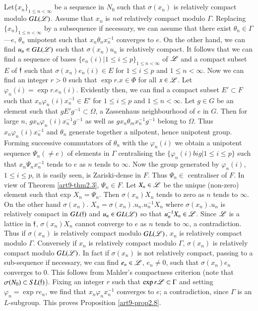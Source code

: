 \subsection{}\label{art9-subsec2.9}
Let\pageoriginale $\{x_n\}_{1 \leqslant n < \infty}$ be a sequence in $N_0$ such that $\sigma (x_n)$ is relatively compact modulo $GL(\mathscr{L})$. Assume that $x_n$ is \textit{not} relatively compact modulo $\Gamma$. Replacing  $\{x_n\}_{1\leq n < \infty}$ by a subsequence if necessary, we can assume that there exist $\theta_n \in \Gamma$---$e$, $\theta_n$  unipotent such that $x_n \theta_n x^{-1}_n$ converges to $e$. On the other hand, we can find $u_n \in GL(\mathscr{L})$ such that $\sigma (x_n) u_n$ is relatively compact. It follows that we can find a sequence of bases $\{e_n (i) \big| 1 \leqslant i \leqslant p\}_{1 \leqslant n < \infty}$ of $\mathscr{L}$ and a compact subset $E$ of $\mathfrak{f}$ such that $\sigma (x_n) e_n (i) \in E$ for $1 \leqslant i \leqslant p$ and $1 \leqslant n < \infty$. Now we can find an integer $r >0$ such that $\exp r. x \in \Phi$ for all $x \in \mathscr{L}$. Let $\varphi_n (i) = \exp r. e_n (i)$. Evidently then, we can find a compact subset $E'\subset F$ such that $x_n \varphi_n (i) x^{-1}_n \in E'$ for $1 \leqslant i \leqslant p$ and $1 \leqslant n < \infty$. Let $g \in G$ be an element such that $g E' g^{-1} \subset \Omega$, a Zassenhaus neighbourhood of $e$ in $G$. Then for large $n$, $gx_n \varphi_n (i) x^{-1}_n g^{-1}$  as well as $gx_n \theta_m x^{-1}_n g^{-1}$ belong to $\Omega$. Thus $x_n \varphi_n (i)x^{-1}_n$ and $\theta_n$ generate together a nilpotent, hence unipotent group. Forming successive commutators of $\theta_n$ with the $\varphi_n (i)$ we obtain a unipotent sequence $\Psi_n (\neq e)$ of elements in $\Gamma$ centralising the $\{\varphi_n (i) big| 1 \leqslant i \leqslant p\}$ such that $x_n \Psi_n x^{-1}_n$ tends to $e$ as $n$ tends to $\infty$. Now the group generated by $\varphi_n (i)$, $1 \leqslant i \leqslant p$, it is easily seen, is Zariski-dense in $F$. Thus $\Psi_n \in $ centraliser of $F$. In view of Theorem \ref{art9-thm2.3}, $\Psi_n \in F$. Let $X_n \in \mathscr{L}$ be the unique (non-zero) element such that exp $X_n = \Psi_n$. Then $\sigma (x_n) X_n$ tends to zero as $n$ tends to $\infty$. On the other hand $\sigma(x_n)$. $X_n = \sigma (x_n). u_n. u^{-1}_n X_n$ where $\sigma (x_n). u_n$ is relatively compact in $GL(\mathfrak{f})$ and $u_n \in G L (\mathscr{L})$ so that $u^{-1}_n X_n \in \mathscr{L}$. Since $\mathscr{L}$ is a lattice in $\mathfrak{f}$, $\sigma (x_n) X_n$ cannot converge to $e$ as $n$ tends to $\infty$, a contradiction. Thus if $\sigma (x_n)$ is relatively compact modulo $GL(\mathscr{L})$, $x_n$ is relatively compact modulo $\Gamma$. Conversely if $x_n$ is relatively compact modulo $\Gamma$, $\sigma (x_n)$ is relatively compact modulo $GL(\mathscr{L})$. In fact if $\sigma (x_n)$ is not relatively compact, passing to a sub-sequence if necessary, we can find $e_n \in \mathscr{L}$, $e_n \neq 0$, such that $\sigma (x_n) e_n$ converges to 0. This follows from Mahler's compactness criterion (note that $\sigma (N_0) \subset SL(\mathfrak{f})$). Fixing an integer $r$ such that $\exp r \mathscr{L} \subset \Gamma$ and setting $\varphi_n = \exp r e_n$, we find that $x_n \varphi_n x^{-1}_n$ converges to $e$; a contradiction, since $\Gamma$ is an $L$-subgroup. This proves Proposition \ref{art9-prop2.8}.
   
